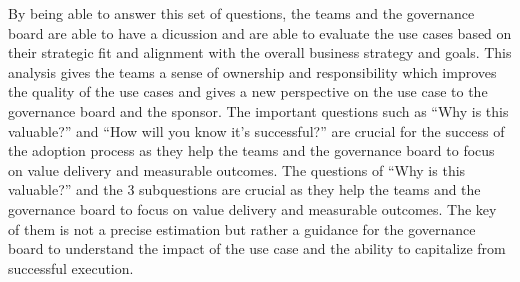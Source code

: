 \documentclass[]{imc-inf}
\begin{document}
By being able to answer this set of questions, the teams and the
governance board are able to have a dicussion and are able to evaluate
the use cases based on their strategic fit and alignment with the
overall business strategy and goals. This analysis gives the teams a
sense of ownership and responsibility which improves the quality of the
use cases and gives a new perspective on the use case to the governance
board and the sponsor. The important questions such as ``Why is this
valuable?'' and ``How will you know it's successful?'' are crucial for
the success of the adoption process as they help the teams and the
governance board to focus on value delivery and measurable outcomes. The
questions of ``Why is this valuable?'' and the 3 subquestions are
crucial as they help the teams and the governance board to focus on
value delivery and measurable outcomes. The key of them is not a precise
estimation but rather a guidance for the governance board to understand
the impact of the use case and the ability to capitalize from successful
execution.
\end{document}
